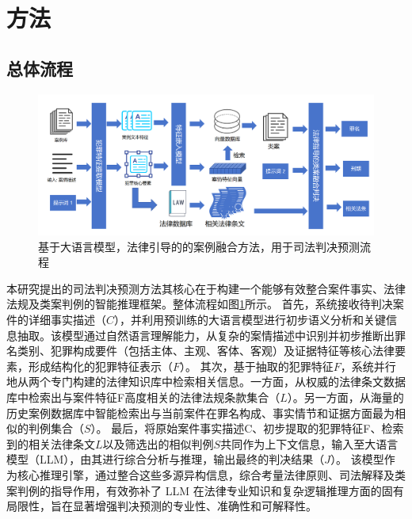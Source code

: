\section{\heiti 方法}
\subsection{\heiti 总体流程}
\begin{figure}[H]
	\centering
	\includegraphics[width=1\linewidth]{fig/main.png}
	\caption{基于大语言模型，法律引导的的案例融合方法，用于司法判决预测流程}
	\label{fig:main}
\end{figure}

本研究提出的司法判决预测方法其核心在于构建一个能够有效整合案件事实、法律法规及类案判例的智能推理框架。整体流程如图\ref{fig:main}所示。
首先，系统接收待判决案件的详细事实描述（$C$），并利用预训练的大语言模型进行初步语义分析和关键信息抽取。该模型通过自然语言理解能力，从复杂的案情描述中识别并初步推断出罪名类别、犯罪构成要件（包括主体、主观、客体、客观）及证据特征等核心法律要素，形成结构化的犯罪特征表示（$F$）。
其次，基于抽取的犯罪特征$F$，系统并行地从两个专门构建的法律知识库中检索相关信息。一方面，从权威的法律条文数据库中检索出与案件特征F高度相关的法律法规条款集合（$L$）。另一方面，从海量的历史案例数据库中智能检索出与当前案件在罪名构成、事实情节和证据方面最为相似的判例集合（$S$）。
最后，将原始案件事实描述C、初步提取的犯罪特征F、检索到的相关法律条文$L$以及筛选出的相似判例$S$共同作为上下文信息，输入至大语言模型（LLM），由其进行综合分析与推理，输出最终的判决结果（$J$）。
该模型作为核心推理引擎，通过整合这些多源异构信息，综合考量法律原则、司法解释及类案判例的指导作用，有效弥补了 LLM 在法律专业知识和复杂逻辑推理方面的固有局限性，旨在显著增强判决预测的专业性、准确性和可解释性。
